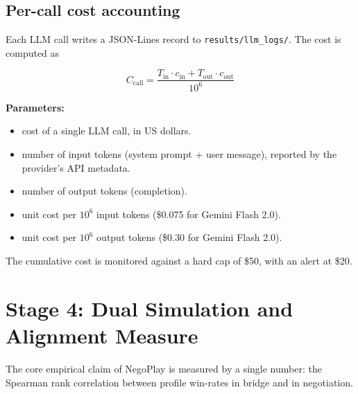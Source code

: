 \documentclass[11pt, a4paper, oneside, openany]{report}
\begin{document}
\subsection{Per-call cost accounting}

Each LLM call writes a JSON-Lines record to \texttt{results/llm\_logs/}. The cost is computed as

\begin{equation}
\label{eq:llm_cost}
C_{\text{call}} = \frac{T_{\text{in}} \cdot c_{\text{in}} + T_{\text{out}} \cdot c_{\text{out}}}{10^6}
\end{equation}

\noindent\textbf{Parameters:}
\begin{itemize}[leftmargin=2.2cm, itemsep=0pt, topsep=2pt]
    \item[$C_{\text{call}}$] cost of a single LLM call, in US dollars.
    \item[$T_{\text{in}}$] number of input tokens (system prompt + user message), reported by the provider's API metadata.
    \item[$T_{\text{out}}$] number of output tokens (completion).
    \item[$c_{\text{in}}$] unit cost per $10^6$ input tokens (\$0.075 for Gemini Flash 2.0).
    \item[$c_{\text{out}}$] unit cost per $10^6$ output tokens (\$0.30 for Gemini Flash 2.0).
\end{itemize}

\noindent The cumulative cost is monitored against a hard cap of \$50, with an alert at \$20.

\section{Stage 4: Dual Simulation and Alignment Measure}
\label{sec:stage4_math}

The core empirical claim of NegoPlay is measured by a single number: the Spearman rank correlation between profile win-rates in bridge and in negotiation.
\end{document}
